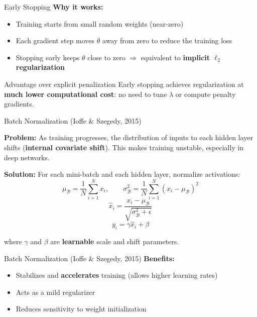 \documentclass[aspectratio=169]{beamer}
\begin{document}
\begin{frame}{Early Stopping}
\textbf{Why it works:}
\begin{itemize}
    \item Training starts from small random weights (near-zero)
    \item Each gradient step moves $\theta$ away from zero to reduce the training loss
    \item Stopping early keeps $\theta$ close to zero $\Rightarrow$ equivalent to \textbf{implicit $\ell_2$ regularization}
\end{itemize}

\vspace{0.2cm}
\begin{block}{Advantage over explicit penalization}
Early stopping achieves regularization at \textbf{much lower computational cost}: no need to tune $\lambda$ or compute penalty gradients.
\end{block}
\end{frame}
%
%
\begin{frame}{Batch Normalization (Ioffe \& Szegedy, 2015)}

\textbf{Problem:} As training progresses, the distribution of inputs to each hidden layer shifts (\textbf{internal covariate shift}). This makes training unstable, especially in deep networks.

\medskip
\textbf{Solution:} For each mini-batch and each hidden layer, normalize activations:
\[
\mu_{\mathcal{B}} = \frac{1}{N}\sum_{i=1}^N x_i, \qquad
\sigma^2_{\mathcal{B}} = \frac{1}{N}\sum_{i=1}^N (x_i - \mu_{\mathcal{B}})^2
\]
\[
\hat{x}_i = \frac{x_i - \mu_{\mathcal{B}}}{\sqrt{\sigma^2_{\mathcal{B}} + \epsilon}}
\]
\[
\boxed{y_i = \gamma \hat{x}_i + \beta}
\]

where $\gamma$ and $\beta$ are \textbf{learnable} scale and shift parameters.
\end{frame}
%
%
\begin{frame}{Batch Normalization (Ioffe \& Szegedy, 2015)}
\textbf{Benefits:}
\begin{itemize}
    \item Stabilizes and \textbf{accelerates} training (allows higher learning rates)
    \item Acts as a mild regularizer
    \item Reduces sensitivity to weight initialization
\end{itemize}
\end{frame}
\end{document}

